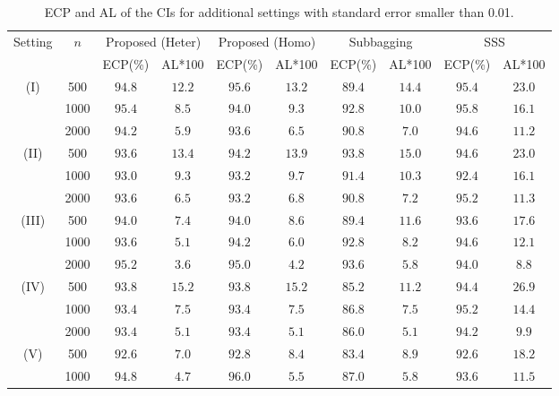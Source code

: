 \documentclass[11pt]{article}
\theoremstyle{referenceplain}
\theoremstyle{referencedefinition}
\theoremstyle{referenceremark}
\begin{document}
\begin{table}[H]
    \centering
    \scriptsize
    \caption{ECP and AL of the CIs for additional settings with standard error smaller than 0.01.}
    \begin{tabular}{|c|c|c|c|c|c|c|c|c|c|}
        \hline
        \multirow{2}{*}{Setting} & \multirow{2}{*}{$n$} & \multicolumn{2}{c|}{Proposed (Heter)} & \multicolumn{2}{c|}{Proposed (Homo)} & \multicolumn{2}{c|}{Subbagging} & \multicolumn{2}{c|}{SSS} \\
        \cline{3-10}
        & & ECP(\%) & AL*100 & ECP(\%) & AL*100 & ECP(\%) & AL*100 & ECP(\%) & AL*100 \\
        \hline
        \multirow{3}{*}{(I)}
        & 500  & $94.8$ & $12.2$ & $95.6$ & $13.2$ & $89.4$ & $14.4$ & $95.4$ & $23.0$ \\
        & 1000 & $95.4$ & $8.5$  & $94.0$ & $9.3$  & $92.8$ & $10.0$ & $95.8$ & $16.1$ \\
        & 2000 & $94.2$ & $5.9$  & $93.6$ & $6.5$  & $90.8$ & $7.0$  & $94.6$ & $11.2$ \\
        \hline
        \multirow{3}{*}{(II)}
        & 500  & $93.6$ & $13.4$ & $94.2$ & $13.9$ & $93.8$ & $15.0$ & $94.6$ & $23.0$ \\
        & 1000 & $93.0$ & $9.3$  & $93.2$ & $9.7$  & $91.4$ & $10.3$ & $92.4$ & $16.1$ \\
        & 2000 & $93.6$ & $6.5$  & $93.2$ & $6.8$  & $90.8$ & $7.2$  & $95.2$ & $11.3$ \\
        \hline
        \multirow{3}{*}{(III)}
        & 500  & $94.0$ & $7.4$  & $94.0$ & $8.6$  & $89.4$ & $11.6$ & $93.6$ & $17.6$ \\
        & 1000 & $93.6$ & $5.1$  & $94.2$ & $6.0$  & $92.8$ & $8.2$  & $94.6$ & $12.1$ \\
        & 2000 & $95.2$ & $3.6$  & $95.0$ & $4.2$  & $93.6$ & $5.8$  & $94.0$ & $8.8$  \\
        \hline
        \multirow{3}{*}{(IV)}
        & 500  & $93.8$ & $15.2$ & $93.8$ & $15.2$ & $85.2$ & $11.2$ & $94.4$ & $26.9$ \\
        & 1000 & $93.4$ & $7.5$  & $93.4$ & $7.5$  & $86.8$ & $7.5$  & $95.2$ & $14.4$ \\
        & 2000 & $93.4$ & $5.1$  & $93.4$ & $5.1$  & $86.0$ & $5.1$  & $94.2$ & $9.9$  \\
        \hline
        \multirow{3}{*}{(V)}
        & 500  & $92.6$ & $7.0$  & $92.8$ & $8.4$  & $83.4$ & $8.9$  & $92.6$ & $18.2$ \\
        & 1000 & $94.8$ & $4.7$  & $96.0$ & $5.5$  & $87.0$ & $5.8$  & $93.6$ & $11.5$ \\

\end{tabular}
\end{table}
\end{document}
